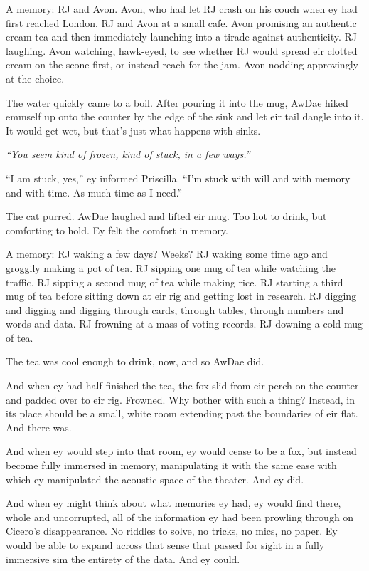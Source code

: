 A memory: RJ and Avon. Avon, who had let RJ crash on his couch when ey had first reached London. RJ and Avon at a small cafe. Avon promising an authentic cream tea and then immediately launching into a tirade against authenticity. RJ laughing. Avon watching, hawk-eyed, to see whether RJ would spread eir clotted cream on the scone first, or instead reach for the jam. Avon nodding approvingly at the choice.

The water quickly came to a boil. After pouring it into the mug, AwDae hiked emmself up onto the counter by the edge of the sink and let eir tail dangle into it. It would get wet, but that's just what happens with sinks.

\emph{``You seem kind of frozen, kind of stuck, in a few ways.''}

``I am stuck, yes,'' ey informed Priscilla. ``I'm stuck with will and with memory and with time. As much time as I need.''

The cat purred. AwDae laughed and lifted eir mug. Too hot to drink, but comforting to hold. Ey felt the comfort in memory.

A memory: RJ waking a few days? Weeks? RJ waking some time ago and groggily making a pot of tea. RJ sipping one mug of tea while watching the traffic. RJ sipping a second mug of tea while making rice. RJ starting a third mug of tea before sitting down at eir rig and getting lost in research. RJ digging and digging and digging through cards, through tables, through numbers and words and data. RJ frowning at a mass of voting records. RJ downing a cold mug of tea.

The tea was cool enough to drink, now, and so AwDae did.

And when ey had half-finished the tea, the fox slid from eir perch on the counter and padded over to eir rig. Frowned. Why bother with such a thing? Instead, in its place should be a small, white room extending past the boundaries of eir flat. And there was.

And when ey would step into that room, ey would cease to be a fox, but instead become fully immersed in memory, manipulating it with the same ease with which ey manipulated the acoustic space of the theater. And ey did.

And when ey might think about what memories ey had, ey would find there, whole and uncorrupted, all of the information ey had been prowling through on Cicero's disappearance. No riddles to solve, no tricks, no mics, no paper. Ey would be able to expand across that sense that passed for sight in a fully immersive sim the entirety of the data. And ey could.

